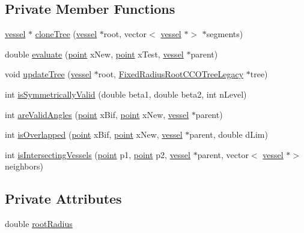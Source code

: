 \subsection*{Private Member Functions}
\begin{DoxyCompactItemize}
\item 
\mbox{\hyperlink{structvessel}{vessel}} $\ast$ \mbox{\hyperlink{class_fixed_radius_root_c_c_o_tree_legacy_aa431d3484d8d4914ed6717bffe65de19}{clone\+Tree}} (\mbox{\hyperlink{structvessel}{vessel}} $\ast$root, vector$<$ \mbox{\hyperlink{structvessel}{vessel}} $\ast$$>$ $\ast$segments)
\item 
double \mbox{\hyperlink{class_fixed_radius_root_c_c_o_tree_legacy_a53a21d00d523d17ad2845954d625aab1}{evaluate}} (\mbox{\hyperlink{structpoint}{point}} x\+New, \mbox{\hyperlink{structpoint}{point}} x\+Test, \mbox{\hyperlink{structvessel}{vessel}} $\ast$parent)
\item 
void \mbox{\hyperlink{class_fixed_radius_root_c_c_o_tree_legacy_a52b3973fad2b0905b6848fd3f7c55221}{update\+Tree}} (\mbox{\hyperlink{structvessel}{vessel}} $\ast$root, \mbox{\hyperlink{class_fixed_radius_root_c_c_o_tree_legacy}{Fixed\+Radius\+Root\+C\+C\+O\+Tree\+Legacy}} $\ast$tree)
\item 
int \mbox{\hyperlink{class_fixed_radius_root_c_c_o_tree_legacy_af66e950340138e0650f52fc2a6b90ea4}{is\+Symmetrically\+Valid}} (double beta1, double beta2, int n\+Level)
\item 
int \mbox{\hyperlink{class_fixed_radius_root_c_c_o_tree_legacy_a1f99abd9b40ce0986e2fc1cb483b6af7}{are\+Valid\+Angles}} (\mbox{\hyperlink{structpoint}{point}} x\+Bif, \mbox{\hyperlink{structpoint}{point}} x\+New, \mbox{\hyperlink{structvessel}{vessel}} $\ast$parent)
\item 
int \mbox{\hyperlink{class_fixed_radius_root_c_c_o_tree_legacy_ab5a4e37cc1fd3633b7a05fc07ed088a9}{is\+Overlapped}} (\mbox{\hyperlink{structpoint}{point}} x\+Bif, \mbox{\hyperlink{structpoint}{point}} x\+New, \mbox{\hyperlink{structvessel}{vessel}} $\ast$parent, double d\+Lim)
\item 
int \mbox{\hyperlink{class_fixed_radius_root_c_c_o_tree_legacy_a2ffef1e8b11af99c71d4f4335c81a625}{is\+Intersecting\+Vessels}} (\mbox{\hyperlink{structpoint}{point}} p1, \mbox{\hyperlink{structpoint}{point}} p2, \mbox{\hyperlink{structvessel}{vessel}} $\ast$parent, vector$<$ \mbox{\hyperlink{structvessel}{vessel}} $\ast$$>$ neighbors)
\end{DoxyCompactItemize}
\subsection*{Private Attributes}
\begin{DoxyCompactItemize}
\item 
double \mbox{\hyperlink{class_fixed_radius_root_c_c_o_tree_legacy_a21b54a45c92fe9c86a3a566966127048}{root\+Radius}}
\end{DoxyCompactItemize}
